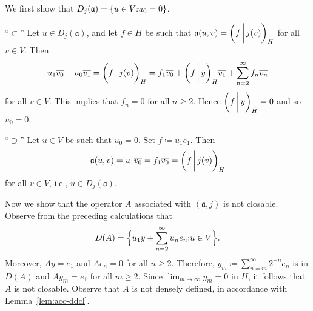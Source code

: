 \documentclass[a4paper,oneside,12pt]{amsart}
\theoremstyle{plain}
\theoremstyle{definition}
\newenvironment{example}
{\pushQED{\qed}

\examplex}
{\popQED\endexamplex}
\let\ge=\geqslant
\begin{document}
\begin{example}
We first show that $D_j({{\mathfrak{{a}}}})={{\ifthenelse{\equal{auto}{auto}}{\left\{{u\in V}{:} {u_0=0}\right\}}{}
\ifthenelse{\equal{auto}{b}}{\bigl\{{u\in V}{:} {u_0=0}\bigr\}}{}
\ifthenelse{\equal{auto}{B}}{\Bigl\{{u\in V}{:} {u_0=0}\Bigr\}}{}
}}$.
\begin{asparaenum}
\item[``$\subset$''] Let $u\in D_j({{\mathfrak{{a}}}})$, and let $f\in H$ be such that
${{\mathfrak{{a}}}}(u,v) = {{\ifthenelse{\equal{auto}{auto}}{\left({f}\mkern3mu{\biggm|}\mkern3mu {j(v)}\right)}{}
\ifthenelse{\equal{auto}{b}}{\bigl({f}\mkern3mu{\biggm|}\mkern3mu {j(v)}\bigr)}{}
\ifthenelse{\equal{auto}{B}}{\Bigl({f}\mkern3mu{\bigm|}\mkern3mu {j(v)}\Bigr)}{}
}}_H$
for all $v\in V$. Then
\[
    u_1{\overline{{v_0}}} - u_0{\overline{{v_1}}} = {{\ifthenelse{\equal{auto}{auto}}{\left({f}\mkern3mu{\biggm|}\mkern3mu {j(v)}\right)}{}
\ifthenelse{\equal{auto}{b}}{\bigl({f}\mkern3mu{\biggm|}\mkern3mu {j(v)}\bigr)}{}
\ifthenelse{\equal{auto}{B}}{\Bigl({f}\mkern3mu{\bigm|}\mkern3mu {j(v)}\Bigr)}{}
}}_H = f_1{\overline{{v_0}}} + {{\ifthenelse{\equal{auto}{auto}}{\left({f}\mkern3mu{\biggm|}\mkern3mu {y}\right)}{}
\ifthenelse{\equal{auto}{b}}{\bigl({f}\mkern3mu{\biggm|}\mkern3mu {y}\bigr)}{}
\ifthenelse{\equal{auto}{B}}{\Bigl({f}\mkern3mu{\bigm|}\mkern3mu {y}\Bigr)}{}
}}_H{\overline{{v_1}}} + \sum_{n=2}^\infty f_n {\overline{{v_n}}}
\]
for all $v\in V$. This implies that $f_n=0$ for all $n\ge 2$.
Hence ${{\ifthenelse{\equal{auto}{auto}}{\left({f}\mkern3mu{\biggm|}\mkern3mu {y}\right)}{}
\ifthenelse{\equal{auto}{b}}{\bigl({f}\mkern3mu{\biggm|}\mkern3mu {y}\bigr)}{}
\ifthenelse{\equal{auto}{B}}{\Bigl({f}\mkern3mu{\bigm|}\mkern3mu {y}\Bigr)}{}
}}_H=0$ and so $u_0=0$.
\item[``$\supset$''] Let $u\in V$ be such that $u_0=0$. Set $f\coloneqq u_1e_1$. Then
\[
    {{\mathfrak{{a}}}}(u,v) = u_1{\overline{{v_0}}} = f_1{\overline{{v_0}}} = {{\ifthenelse{\equal{auto}{auto}}{\left({f}\mkern3mu{\biggm|}\mkern3mu {j(v)}\right)}{}
\ifthenelse{\equal{auto}{b}}{\bigl({f}\mkern3mu{\biggm|}\mkern3mu {j(v)}\bigr)}{}
\ifthenelse{\equal{auto}{B}}{\Bigl({f}\mkern3mu{\bigm|}\mkern3mu {j(v)}\Bigr)}{}
}}_H
\]
for all $v\in V$, i.e., $u\in D_j({{\mathfrak{{a}}}})$.
\end{asparaenum}

Now we show that the operator $A$ associated with $({{\mathfrak{{a}}}},j)$ is not closable.
Observe from the preceding calculations that
\[
    D(A)={{\ifthenelse{\equal{B}{auto}}{\left\{{u_1 y + \sum_{n=2}^\infty u_n e_n}{:} {u\in V}\right\}}{}
\ifthenelse{\equal{B}{b}}{\bigl\{{u_1 y + \sum_{n=2}^\infty u_n e_n}{:} {u\in V}\bigr\}}{}
\ifthenelse{\equal{B}{B}}{\Bigl\{{u_1 y + \sum_{n=2}^\infty u_n e_n}{:} {u\in V}\Bigr\}}{}
}}.
\]
Moreover, $Ay=e_1$ and $Ae_n=0$ for all $n\ge 2$.
Therefore, $y_m\coloneqq \sum_{n=m}^\infty 2^{-n}e_n$ is in $D(A)$ and $Ay_m=e_1$ for all $m\ge 2$.
Since $\lim_{m\to\infty}y_m=0$ in $H$, it follows that $A$ is not closable.
Observe that $A$ is not densely defined, in accordance with Lemma~\ref{lem:acc-ddcl}.


\end{example}
\end{document}
